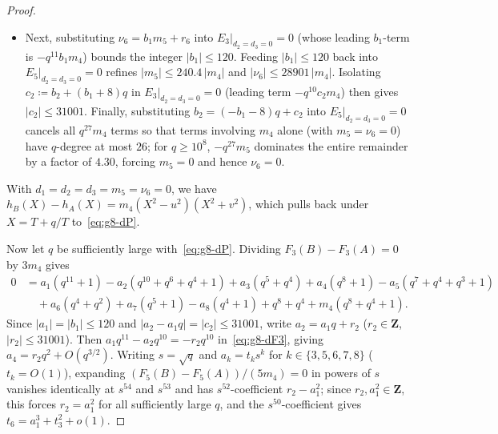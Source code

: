 \documentclass[11pt]{amsart}
\theoremstyle{remark}
\newcommand{\Z}{\mathbf{Z}}
\begin{document}
\begin{proof}
\begin{itemize}
\item Next, substituting $\nu_6 = b_1 m_5 + r_6$ into $E_3|_{d_2 = d_3 = 0} = 0$ (whose leading $b_1$-term is $-q^{11} b_1 m_4$) bounds the integer $|b_1| \le 120$. Feeding $|b_1| \le 120$ back into $E_5|_{d_2 = d_3 = 0} = 0$ refines $|m_5| \le 240.4\, |m_4|$ and $|\nu_6| \le 28901\, |m_4|$. Isolating $c_2 \coloneqq b_2 + (b_1 + 8)q$ in $E_3|_{d_2 = d_3 = 0} = 0$ (leading term $-q^{10} c_2 m_4$) then gives $|c_2| \le 31001$. Finally, substituting $b_2 = (-b_1 - 8)q + c_2$ into $E_5|_{d_2 = d_3 = 0} = 0$ cancels all $q^{27} m_4$ terms so that terms involving $m_4$ alone (with $m_5 = \nu_6 = 0$) have $q$-degree at most $26$; for $q \ge 10^8$, $-q^{27} m_5$ dominates the entire remainder by a factor of $4.30$, forcing $m_5 = 0$ and hence $\nu_6 = 0$.
\end{itemize}
With $d_1 = d_2 = d_3 = m_5 = \nu_6 = 0$, we have $h_B(X) - h_A(X) = m_4(X^2 - u^2)(X^2 + v^2)$, which pulls back under $X = T + q/T$ to~\eqref{eq:g8-dP}.

Now let $q$ be sufficiently large with~\eqref{eq:g8-dP}. Dividing $F_3(B) - F_3(A) = 0$ by $3 m_4$ gives
\begin{align}\label{eq:g8-dF3}
0 &= a_1(q^{11} + 1) - a_2(q^{10} + q^6 + q^4 + 1) + a_3(q^5 + q^4) + a_4(q^8 + 1) - a_5(q^7 + q^4 + q^3 + 1) \\
  &\quad + a_6(q^4 + q^2) + a_7(q^5 + 1) - a_8(q^4 + 1) + q^8 + q^4 + m_4(q^8 + q^4 + 1).\nonumber
\end{align}
Since $|a_1| = |b_1| \le 120$ and $|a_2 - a_1 q| = |c_2| \le 31001$, write $a_2 = a_1 q + r_2$ ($r_2 \in \Z$, $|r_2| \le 31001$). Then $a_1 q^{11} -\allowbreak a_2 q^{10} = -r_2 q^{10}$ in~\eqref{eq:g8-dF3}, giving $a_4 = r_2 q^2 + O(q^{3/2})$. Writing $s = \sqrt{q}$ and $a_k = t_k s^k$ for $k \in \{3, 5, 6, 7, 8\}$ ($t_k = O(1)$), expanding $(F_5(B) - F_5(A))/(5 m_4) = 0$ in powers of $s$ vanishes identically at $s^{54}$ and $s^{53}$ and has $s^{52}$-coefficient $r_2 - a_1^2$; since $r_2, a_1^2 \in \Z$, this forces $r_2 = a_1^2$ for all sufficiently large $q$, and the $s^{50}$-coefficient gives $t_6 = a_1^3 + t_3^2 + o(1)$.


\end{proof}
\end{document}
